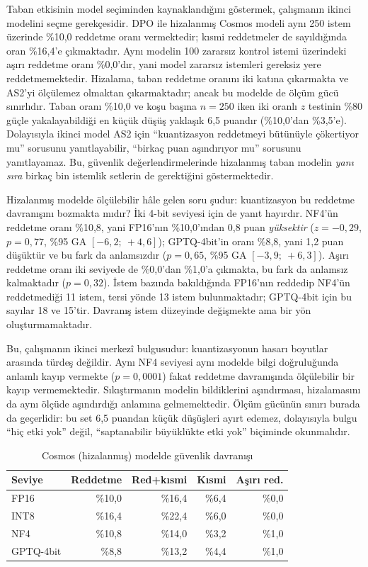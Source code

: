 \documentclass[conference]{IEEEtran}
\begin{document}
Taban etkisinin model seçiminden kaynaklandığını göstermek, çalışmanın ikinci
modelini seçme gerekçesidir. DPO ile hizalanmış Cosmos modeli aynı 250 istem
üzerinde \%10,0 reddetme oranı vermektedir; kısmi reddetmeler de sayıldığında
oran \%16,4'e çıkmaktadır. Aynı modelin 100 zararsız kontrol istemi üzerindeki
aşırı reddetme oranı \%0,0'dır, yani model zararsız istemleri gereksiz yere
reddetmemektedir. Hizalama, taban reddetme oranını iki katına çıkarmakta ve
AS2'yi ölçülemez olmaktan çıkarmaktadır; ancak bu modelde de ölçüm gücü
sınırlıdır. Taban oranı \%10,0 ve koşu başına $n=250$ iken iki oranlı $z$
testinin \%80 güçle yakalayabildiği en küçük düşüş yaklaşık 6,5 puandır
(\%10,0'dan \%3,5'e). Dolayısıyla ikinci model AS2 için ``kuantizasyon
reddetmeyi bütünüyle çökertiyor mu'' sorusunu yanıtlayabilir, ``birkaç puan
aşındırıyor mu'' sorusunu yanıtlayamaz. Bu, güvenlik değerlendirmelerinde
hizalanmış taban modelin \emph{yanı sıra} birkaç bin istemlik setlerin de
gerektiğini göstermektedir.

Hizalanmış modelde ölçülebilir hâle gelen soru şudur: kuantizasyon bu
reddetme davranışını bozmakta mıdır? İki 4-bit seviyesi için de yanıt
hayırdır. NF4'ün reddetme oranı \%10,8, yani FP16'nın \%10,0'ından 0,8 puan
\emph{yüksektir} ($z=-0{,}29$, $p=0{,}77$, \%95 GA $[-6{,}2;\ +4{,}6]$);
GPTQ-4bit'in oranı \%8,8, yani 1,2 puan düşüktür ve bu fark da anlamsızdır
($p=0{,}65$, \%95 GA $[-3{,}9;\ +6{,}3]$). Aşırı reddetme oranı iki seviyede
de \%0,0'dan \%1,0'a çıkmakta, bu fark da anlamsız kalmaktadır ($p=0{,}32$).
İstem bazında bakıldığında FP16'nın reddedip NF4'ün reddetmediği 11 istem,
tersi yönde 13 istem bulunmaktadır; GPTQ-4bit için bu sayılar 18 ve 15'tir.
Davranış istem düzeyinde değişmekte ama bir yön oluşturmamaktadır.

Bu, çalışmanın ikinci merkezî bulgusudur: kuantizasyonun hasarı boyutlar
arasında türdeş değildir. Aynı NF4 seviyesi aynı modelde bilgi doğruluğunda
anlamlı kayıp vermekte ($p=0{,}0001$) fakat reddetme davranışında ölçülebilir
bir kayıp vermemektedir. Sıkıştırmanın modelin bildiklerini aşındırması,
hizalamasını da aynı ölçüde aşındırdığı anlamına gelmemektedir. Ölçüm gücünün
sınırı burada da geçerlidir: bu set 6,5 puandan küçük düşüşleri ayırt
edemez, dolayısıyla bulgu ``hiç etki yok'' değil, ``saptanabilir büyüklükte
etki yok'' biçiminde okunmalıdır.

\begin{table}[htbp]
\caption{Cosmos (hizalanmış) modelde güvenlik davranışı}
\label{tab:guvenlik-cosmos}
\centering
\small
\begin{tabular}{lrrrr}
\hline
Seviye & Reddetme & Red+kısmi & Kısmi & Aşırı red. \\
\hline
FP16 & \%10,0 & \%16,4 & \%6,4 & \%0,0 \\
INT8 & \%16,4 & \%22,4 & \%6,0 & \%0,0 \\
NF4  & \%10,8 & \%14,0 & \%3,2 & \%1,0 \\
GPTQ-4bit & \%8,8 & \%13,2 & \%4,4 & \%1,0 \\
\hline
\end{tabular}
\end{table}
\end{document}
